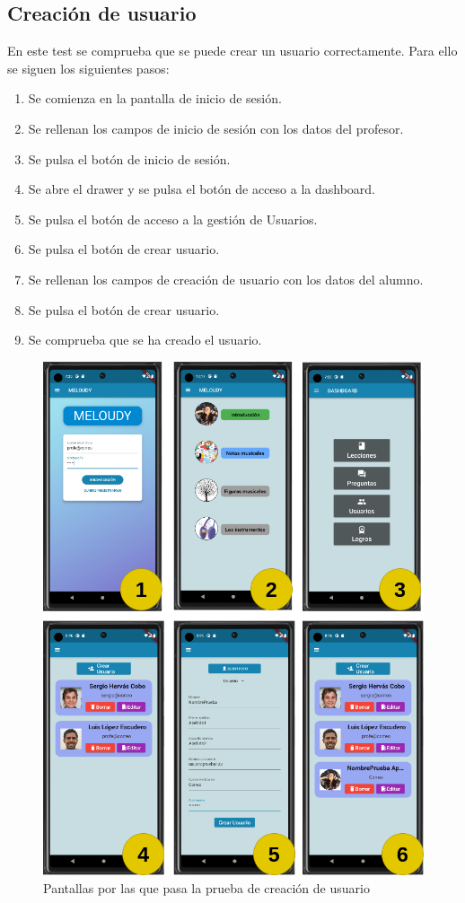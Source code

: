 \subsection{Creación de usuario}
En este test se comprueba que se puede crear un usuario correctamente. Para ello se siguen los siguientes pasos:
\begin{enumerate}
    \item Se comienza en la pantalla de inicio de sesión.
    \item Se rellenan los campos de inicio de sesión con los datos del profesor.
    \item Se pulsa el botón de inicio de sesión.
    \item Se abre el drawer y se pulsa el botón de acceso a la dashboard.
    \item Se pulsa el botón de acceso a la gestión de Usuarios.
    \item Se pulsa el botón de crear usuario.
    \item Se rellenan los campos de creación de usuario con los datos del alumno.
    \item Se pulsa el botón de crear usuario.
    \item Se comprueba que se ha creado el usuario.
\end{enumerate}

\begin{figure}[H]
    \centering
    \includegraphics[width=\textwidth]{imagenes/c8/testint1.png}
    \caption{Pantallas por las que pasa la prueba de creación de usuario}
    \label{fig:prueba_creacion_usuario}
\end{figure}

